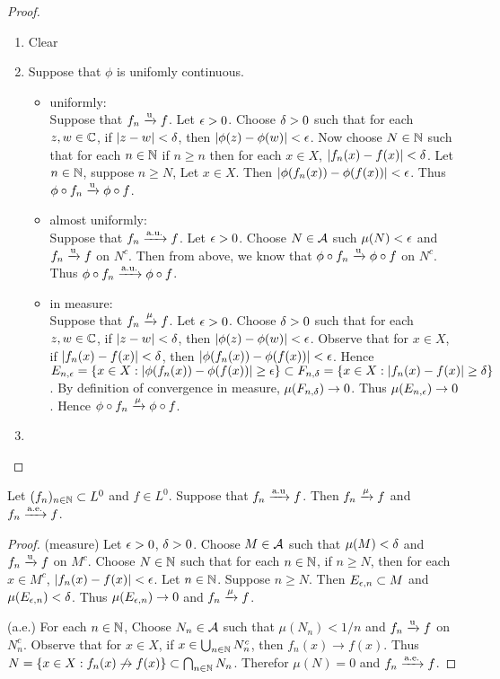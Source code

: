 \documentclass{book}
\begin{document}
	\begin{proof}\
		\begin{enumerate}
			\item Clear
			\item Suppose that $\phi$ is unifomly continuous. 
			\begin{itemize}
				\item uniformly: \\
				Suppose that $f_n \xrightarrow{\text{u}} f$. Let $\epsilon > 0$. Choose $\delta >0$ such that for each $z,w \in \mathbb{C}$, if $|z-w|<\delta$, then $|\phi(z) - \phi(w)| < \epsilon$. Now choose $N \in \mathbb{N}$ such that for each $n \in \mathbb{N}$ if $n \geq n$ then for each $x \in X$, $|f_n(x)-f(x)| < \delta$. Let $n \in \mathbb{N}$, suppose $n \geq N$, Let $x \in X$. Then $|\phi(f_n(x)) - \phi(f(x))| < \epsilon$. Thus $\phi \circ f_n \xrightarrow{\text{u}} \phi \circ f$. 
				\item almost uniformly: \\
				Suppose that $f_n \xrightarrow{\text{a.u.}} f$. Let $\epsilon > 0$. Choose $N \in \mathcal{A}$ such $\mu(N) < \epsilon$ and $f_n \xrightarrow{\text{u}} f$ on $N^c$. Then from above, we know that $\phi \circ f_n \xrightarrow{\text{u}} \phi \circ f$ on $N^c$. Thus $\phi \circ f_n \xrightarrow{\text{a.u.}} \phi \circ f$.
				\item in measure:\\ Suppose that $f_n \xrightarrow{\mu} f$. Let $\epsilon > 0$. Choose $\delta >0$ such that for each $z,w \in \mathbb{C}$, if $|z-w|<\delta$, then $|\phi(z) - \phi(w)| < \epsilon$. Observe that for $x \in X$, if $|f_n(x) - f(x)| < \delta$, then $|\phi(f_n(x)) - \phi(f(x))| < \epsilon$. Hence $E_{n,\epsilon} = \{x \in X: |\phi(f_n(x)) - \phi(f(x))| \geq \epsilon\} \subset F_{n,\delta} = \{x \in X: |f_n(x) - f(x)| \geq \delta\}$. By definition of convergence in measure, $\mu(F_{n,\delta}) \rightarrow 0$. Thus $\mu(E_{n,\epsilon}) \rightarrow 0$. Hence $\phi \circ f_n \xrightarrow{\mu} \phi \circ f$.
			\end{itemize}
			\item
		\end{enumerate}
	\end{proof}
	
	\begin{ex}  
		Let $(f_n)_{n \in \mathbb{N}} \subset L^0$ and $f \in L^0$. Suppose that $f_n \xrightarrow{\text{a.u}} f$. Then $f_n \xrightarrow{\mu}f$ and $f_n \xrightarrow{\text{a.e.}}f$. 
	\end{ex}
	
	\begin{proof}
		(measure) Let $\epsilon>0$, $\delta >0$. Choose $M \in \mathcal{A}$ such that $\mu(M) < \delta$ and $f_n \xrightarrow{\text{u}} f$ on $M^c$. Choose $N \in \mathbb{N}$ such that for each $n \in \mathbb{N}$, if $n \geq N$, then for each $x \in M^c$, $|f_n(x) - f(x)| < \epsilon$. Let $n \in \mathbb{N}$. Suppose $n \geq N$. Then $E_{\epsilon,n} \subset M$ and $\mu(E_{\epsilon,n}) < \delta$. Thus $\mu(E_{\epsilon,n}) \rightarrow 0$ and $f_n \xrightarrow{\mu} f$.
		
		(a.e.) For each $n \in \mathbb{N}$, Choose $N_n \in \mathcal{A}$ such that $\mu(N_n) < 1/n$ and $f_n \xrightarrow{\text{u}} f$ on $N_n^c$. Observe that for $x \in X$, if $x \in \bigcup_{n \in \mathbb{N}}N_n^c$, then $f_n(x) \rightarrow f(x)$. Thus $N = \{x \in X: f_n(x) \not \rightarrow f(x)\} \subset \bigcap_{n \in \mathbb{N}} N_n$. Therefor $\mu(N) = 0$ and $f_n \xrightarrow{\text{a.e.}} f$.
	\end{proof}
	
\end{document}
